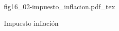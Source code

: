 \begin{figure}[h]
\centering
\def\svgwidth{0.5\textwidth}
{fig16_02-impuesto_inflacion.pdf_tex}
\caption{Impuesto inflación}
\label{fig16_02-impuesto_inflacion}
\end{figure}